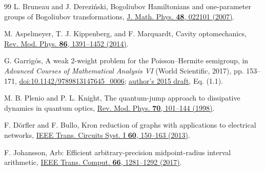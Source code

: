 \documentclass[aps,pra,reprint,superscriptaddress,longbibliography]{revtex4-2}
\begin{document}
\begin{thebibliography}{99}
L. Bruneau and J. Derezi\'{n}ski,
Bogoliubov Hamiltonians and one-parameter groups of Bogoliubov transformations,
\href{https://bruneau.perso.math.cnrs.fr/bogoliubovJMP.pdf}
{J. Math. Phys. \textbf{48}, 022101 (2007)}.

M. Aspelmeyer, T. J. Kippenberg, and F. Marquardt,
Cavity optomechanics,
\href{https://doi.org/10.1103/RevModPhys.86.1391}
{Rev. Mod. Phys. \textbf{86}, 1391--1452 (2014)}.

G. Garrig\'{o}s,
A weak 2-weight problem for the Poisson--Hermite semigroup,
in \emph{Advanced Courses of Mathematical Analysis VI}
(World Scientific, 2017), pp. 153--171,
\href{https://doi.org/10.1142/9789813147645_0006}
{doi:10.1142/9789813147645\_0006};
\href{https://webs.um.es/gustavo.garrigos/papers/garrigos_antequera_proc_june2015.pdf}
{author's 2015 draft}, Eq. (1.1).

M. B. Plenio and P. L. Knight,
The quantum-jump approach to dissipative dynamics in quantum optics,
\href{https://doi.org/10.1103/RevModPhys.70.101}
{Rev. Mod. Phys. \textbf{70}, 101--144 (1998)}.

F. D\"orfler and F. Bullo,
Kron reduction of graphs with applications to electrical networks,
\href{https://doi.org/10.1109/TCSI.2012.2215780}
{IEEE Trans. Circuits Syst. I \textbf{60}, 150--163 (2013)}.

F. Johansson,
Arb: Efficient arbitrary-precision midpoint-radius interval arithmetic,
\href{https://doi.org/10.1109/TC.2017.2690633}
{IEEE Trans. Comput. \textbf{66}, 1281--1292 (2017)}.

\end{thebibliography}
\end{document}
